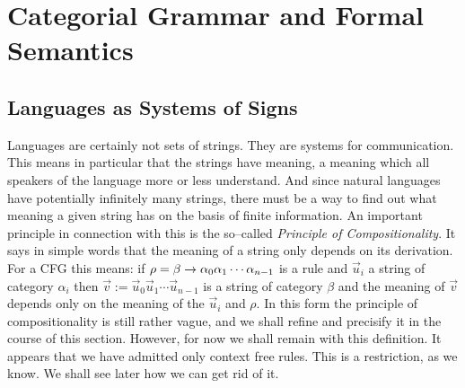 \chapter{Categorial Grammar and Formal Semantics}
\thispagestyle{empty}
\label{kap3}
%
%
%
\section{Languages as Systems of Signs}
\label{kap3-1}
%
%
%
Languages are certainly not sets of strings. They are systems for
communication. This means in particular that the strings have
meaning, a meaning which all speakers of the language more or 
less understand. And since natural languages have potentially
infinitely many strings, there must be a way to find out what meaning
a given string has on the basis of finite information. An important
principle in connection with this is the so--called
{\it Principle of Compositionality\/}. It says in simple words that
the meaning of a string only depends on its derivation. For a CFG this 
means: if $\rho = \beta \rightarrow \alpha_0 \alpha_1 \dotsb \alpha_{n-1}$ 
is a rule and $\vec{u}_i$ a string of category $\alpha_i$ then 
$\vec{v} := \vec{u}_0 \vec{u}_1 \dotsb \vec{u}_{n-1}$ is a
string of category $\beta$ and the meaning of $\vec{v}$ depends only 
on the meaning of the $\vec{u}_i$ and $\rho$. In this form the principle 
of compositionality is still rather vague, and we shall refine
and precisify it in the course of this section. However, for now we
shall remain with this definition. It appears that we have admitted
only context free rules. This is a restriction, as we know. We shall
see later how we can get rid of it.

